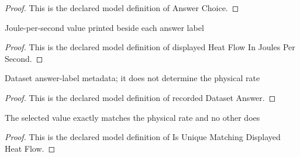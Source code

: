 \begin{proof}
  This is the declared model definition of Answer Choice.
\end{proof}
\begin{definition}
  \label{def:physics:phyx-mini-0466:phyxminiproblems-problemphyxmini0466-displayedheatflowinjoulespersecond}
  Joule-per-second value printed beside each answer label
\end{definition}
\begin{proof}
  This is the declared model definition of displayed Heat Flow In Joules Per Second.
\end{proof}
\begin{definition}
  \label{def:physics:phyx-mini-0466:phyxminiproblems-problemphyxmini0466-recordeddatasetanswer}
  Dataset answer-label metadata; it does not determine the physical rate
\end{definition}
\begin{proof}
  This is the declared model definition of recorded Dataset Answer.
\end{proof}
\begin{definition}
  \label{def:physics:phyx-mini-0466:phyxminiproblems-problemphyxmini0466-isuniquematchingdisplayedheatflow}
  The selected value exactly matches the physical rate and no other does
\end{definition}
\begin{proof}
  This is the declared model definition of Is Unique Matching Displayed Heat Flow.
\end{proof}
